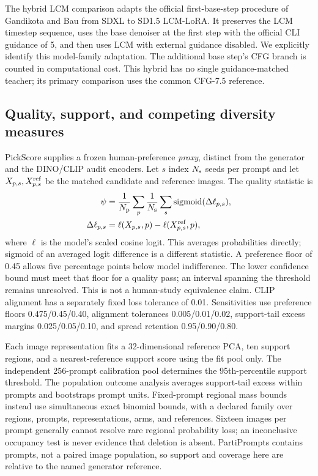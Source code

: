 The hybrid LCM comparison adapts the official first-base-step procedure of
Gandikota and Bau \cite{gandikota2026diversity} from SDXL to SD1.5 LCM-LoRA.
It preserves the LCM timestep sequence, uses the base denoiser at the first
step with the official CLI guidance of 5, and then uses LCM with external
guidance disabled. We explicitly identify this model-family adaptation.
The additional base step's CFG branch is counted in computational cost.
This hybrid has no single guidance-matched teacher; its primary comparison uses
the common CFG-7.5 reference.

\subsection{Quality, support, and competing diversity measures}
PickScore \cite{kirstain2023pickapic} supplies a frozen human-preference
\emph{proxy}, distinct from the generator and the DINO/CLIP audit encoders.
Let $s$ index $N_{\rm s}$ seeds per prompt and let $X_{p,s},X^{\rm ref}_{p,s}$
be the matched candidate and reference images. The quality statistic is
\begin{equation}
 \begin{aligned}
 \psi&=\frac{1}{N_{\rm p}}\sum_p\frac{1}{N_{\rm s}}\sum_s
 \operatorname{sigmoid}(\Delta\ell_{p,s}),\\
 \Delta\ell_{p,s}&=\ell(X_{p,s},p)-\ell(X^{\rm ref}_{p,s},p),
 \end{aligned}
\label{eq:supp_pickscore_preference}
\end{equation}
where $\ell$ is the model's scaled cosine logit. This averages probabilities
directly; sigmoid of an averaged logit difference is a different statistic.
A preference floor of 0.45 allows five percentage points below model
indifference. The lower confidence bound must meet that floor for a quality
pass; an interval spanning the threshold remains unresolved. This is not a
human-study equivalence claim. CLIP alignment has a separately fixed loss
tolerance of 0.01. Sensitivities use preference floors 0.475/0.45/0.40,
alignment tolerances 0.005/0.01/0.02, support-tail excess margins
0.025/0.05/0.10, and spread retention 0.95/0.90/0.80.

Each image representation fits a 32-dimensional reference PCA, ten support
regions, and a nearest-reference support score using the fit pool only.
The independent 256-prompt calibration pool determines the 95th-percentile
support threshold. The population outcome analysis averages support-tail
excess within prompts and bootstraps prompt units. Fixed-prompt regional mass
bounds instead use simultaneous exact binomial bounds, with a declared family
over regions, prompts, representations, arms, and references. Sixteen images
per prompt generally cannot resolve rare regional probability loss; an
inconclusive occupancy test is never evidence that deletion is absent.
PartiPrompts contains prompts, not a paired image population, so support and
coverage here are relative to the named generator reference.

